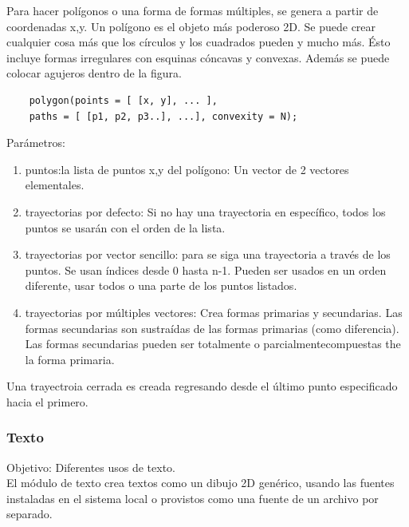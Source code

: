 \documentclass{article}
\begin{document}
Para hacer polígonos o una forma de formas múltiples, se genera a partir de coordenadas x,y. Un polígono es el objeto más poderoso 2D.
Se puede crear cualquier cosa más que los círculos y los cuadrados pueden y mucho más. Ésto incluye formas irregulares con esquinas cóncavas y convexas. Además se puede colocar agujeros dentro de la figura.\citep{WikiOpensCAD}
\\

\begin{verbatim}
    polygon(points = [ [x, y], ... ],
    paths = [ [p1, p2, p3..], ...], convexity = N);
\end{verbatim}

Parámetros:\\

\begin{enumerate}
    \item puntos:la lista de puntos x,y del polígono: Un vector de 2 vectores elementales.
    \item trayectorias por defecto: Si no hay una trayectoria en específico, todos los puntos se usarán con el orden de la lista.
    \item trayectorias por vector sencillo: para se siga una trayectoria a través de los puntos. Se usan índices desde 0 hasta n-1. Pueden ser usados en un orden diferente, usar todos o una parte de los puntos listados. 
    \item trayectorias por múltiples vectores: Crea formas primarias y secundarias. Las formas secundarias son sustraídas de las formas primarias (como diferencia). Las formas secundarias pueden ser totalmente o parcialmentecompuestas the la forma primaria.

    
\end{enumerate}

Una trayectroia cerrada es creada regresando desde el último punto especificado hacia el primero.\citep{WikiOpensCAD}
\\

\subsubsection{Texto}

Objetivo: Diferentes usos de texto.\citep{OpenSCS}\\

El módulo de texto crea textos como un dibujo 2D genérico, usando las fuentes instaladas en el sistema local o provistos como una fuente de un archivo por separado.\citep{OpenSCADtext}
\\
\end{document}
